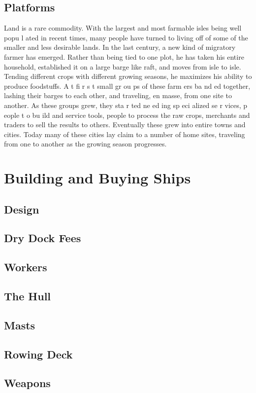 \begin{multicols*}{2}
\subsection{Platforms}
Land is a rare commodity. With the largest and
most farmable isles being well popu l ated in recent times,
many people have turned to living off of some of the smaller
and less desirable lands. In the last century, a new kind of
migratory farmer has emerged. Rather than being tied to one
plot, he has taken his entire household, established it on a
large barge like raft, and moves from isle to isle. Tending
different crops with different growing seasons, he maximizes
his ability to produce foodstuffs.
A t fi r s t small gr ou ps of these farm ers ba nd ed
together, lashing their barges to each other, and traveling, en
masse, from one site to another. As these groups grew, they
sta r ted ne ed ing sp eci alized se r vices, p eople t o bu ild and
service tools, people to process the raw crops, merchants and
traders to sell the results to others. Eventually these grew into
entire towns and cities. Today many of these cities lay claim
to a number of home sites, traveling from one to another as
the growing season progresses.
\section{Building and Buying Ships}
\subsection{Design}
\subsection{Dry Dock Fees}
\subsection{Workers}
\subsection{The Hull}
\subsection{Masts}
\subsection{Rowing Deck}
\subsection{Weapons}

\end{multicols*}
